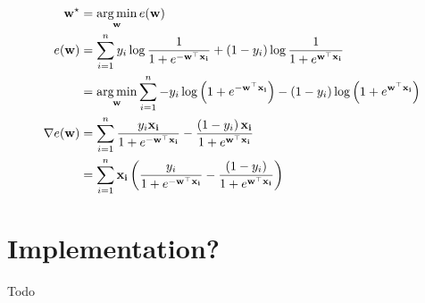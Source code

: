\documentclass[assignment03_Solutions]{subfiles}
\begin{document}
\begin{align}
\mathbf{w^\star} &= \operatorname*{arg\,min}_{\mathbf{w}} e(\mathbf{w}) \\
e(\mathbf{w}) &= \sum_{i=1}^n y_i \log \frac{1}{1 + e^{-\mathbf{w}^\top \mathbf{x_i}}} +  (1-y_i) \log \frac{1}{1 + e^{\mathbf{w}^\top \mathbf{x_i}}} \\
&= \operatorname*{arg\,min}_{\mathbf{w}} \sum_{i=1}^n -y_i \log \left ( 1 + e^{-\mathbf{w}^\top \mathbf{x_i}} \right) -  (1-y_i) \log \left ( 1 + e^{\mathbf{w}^\top \mathbf{x_i}} \right) \\
\nabla e(\mathbf{w}) &= \sum_{i=1}^n \frac{y_i \mathbf{x_i}}{1 + e^{-\mathbf{w}^\top \mathbf{x_i}}} - \frac{\left ( 1 - y_i \right) \mathbf{x_i}}{1 + e^{\mathbf{w}^\top \mathbf{x_i}} } \\
&= \sum_{i=1}^n \mathbf{x_i} \left ( \frac{y_i }{1 + e^{-\mathbf{w}^\top \mathbf{x_i}}} - \frac{\left ( 1 - y_i \right) }{1 + e^{\mathbf{w}^\top \mathbf{x_i}} } \right)
\end{align}

\section{Implementation?}
Todo
\end{document}
